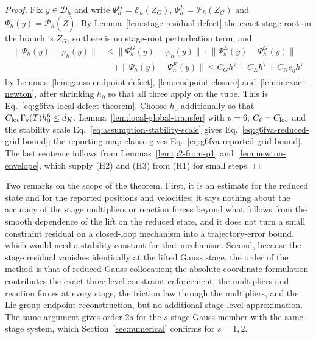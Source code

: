 \documentclass[preprint,12pt]{elsarticle}
\begin{document}
\begin{proof}
Fix $y\in\mathcal D_h$ and write $\Psi_h^G=\mathcal E_h(Z_G)$, $\Psi_h^E=\mathcal P_h(Z_G)$ and
$\Psi_h(y)=\mathcal P_h(\widetilde Z)$. By Lemma~\ref{lem:stage-residual-defect} the exact stage
root on the branch is $Z_G$, so there is no stage-root perturbation term, and
\begin{equation}
\label{eq:three-term-local-defect-sum}
\begin{aligned}
  \|\Psi_h(y)-\varphi_h(y)\|
  &\le\|\Psi_h^G(y)-\varphi_h(y)\|+\|\Psi_h^E(y)-\Psi_h^G(y)\|\\
  &\quad+\|\Psi_h(y)-\Psi_h^E(y)\|
  \le C_Gh^7+C_Eh^7+C_Nc_\eta h^7
\end{aligned}
\end{equation}
by Lemmas~\ref{lem:gauss-endpoint-defect}, \ref{lem:endpoint-closure}
and~\ref{lem:inexact-newton}, after shrinking $h_0$ so that all three apply on the tube. This is
Eq.~\eqref{eq:g6fva-local-defect-theorem}. Choose $h_0$ additionally so that
$C_{\rm loc}\Gamma_s(T)h_0^6\le d_K$. Lemma~\ref{lem:local-global-transfer} with $p=6$,
$C_\ell=C_{\rm loc}$ and the stability scale Eq.~\eqref{eq:assumption-stability-scale} gives
Eq.~\eqref{eq:g6fva-reduced-grid-bound}; the reporting-map clause gives
Eq.~\eqref{eq:g6fva-reported-grid-bound}. The last sentence follows from
Lemmas~\ref{lem:p2-from-p1} and~\ref{lem:newton-envelope}, which supply (H2) and (H3) from (H1) for
small steps.
\end{proof}

Two remarks on the scope of the theorem. First, it is an estimate for the reduced state and for the
reported positions and velocities; it says nothing about the accuracy of the stage multipliers or
reaction forces beyond what follows from the smooth dependence of the lift on the reduced state, and
it does not turn a small constraint residual on a closed-loop mechanism into a trajectory-error
bound, which would need a stability constant for that mechanism. Second, because the stage residual
vanishes identically at the lifted Gauss stage, the order of the method is that of reduced Gauss
collocation; the absolute-coordinate formulation contributes the exact three-level constraint
enforcement, the multipliers and reaction forces at every stage, the friction law through the
multipliers, and the Lie-group endpoint reconstruction, but no additional stage-level
approximation. The same argument gives order $2s$ for the $s$-stage Gauss member with the same
stage system, which Section~\ref{sec:numerical} confirms for $s=1,2$.
\end{document}
